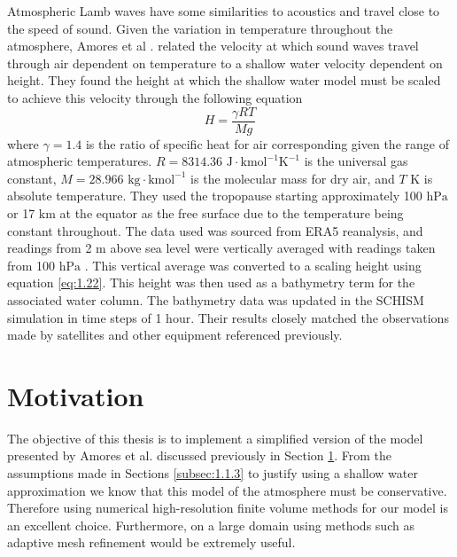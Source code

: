 \documentclass[twoside]{bsu-ms}
\begin{document}
\indent Atmospheric Lamb waves have some similarities to acoustics and travel close to the speed of sound. Given the variation in temperature throughout the atmosphere, Amores et al \cite{amores2022numerical}. related the velocity at which sound waves travel through air dependent on temperature to a shallow water velocity dependent on height. They found the height at which the shallow water model must be scaled to achieve this velocity through the following equation  
\begin{equation}\label{eq:1.22}
	H=\frac{\gamma R T}{Mg}
\end{equation}
where $\gamma=1.4$ is the ratio of specific heat for air corresponding given the range of atmospheric temperatures. $R=8314.36$ $\mathrm{J\cdot kmol}^{-1}\mathrm{K}^{-1}$ is the universal gas constant, $M=28.966$ $\mathrm{kg\cdot kmol}^{-1}$ is the molecular mass for dry air, and $T$ $\mathrm{K}$ is absolute temperature. They used the tropopause starting approximately 100 $\mathrm{hPa}$ or 17 $\mathrm{km}$ at the equator as the free surface due to the temperature being constant throughout. The data used was sourced from ERA5 reanalysis, and readings from 2 $\mathrm{m}$ \cite{hersbach2018era51} above sea level were vertically averaged with readings taken from 100 $\mathrm{hPa}$ \cite{hersbach2018era52}. This vertical average was converted to a scaling height using equation \eqref{eq:1.22}. This height was then used as a bathymetry term for the associated water column. The bathymetry data was updated in the SCHISM simulation in time steps of 1 hour. Their results closely matched the observations made by satellites and other equipment referenced previously. 
%
%
\section{Motivation}\label{sec:1.3}
The objective of this thesis is to implement a simplified version of the model presented by Amores et al. \cite{amores2022numerical} discussed previously in Section \ref{sec:1.3}. From the assumptions made in Sections \ref{subsec:1.1.3} to justify using a shallow water approximation we know that this model of the atmosphere must be conservative. Therefore using numerical high-resolution finite volume methods for our model is an excellent choice. Furthermore, on a large domain using methods such as adaptive mesh refinement would be extremely useful.
\end{document}

